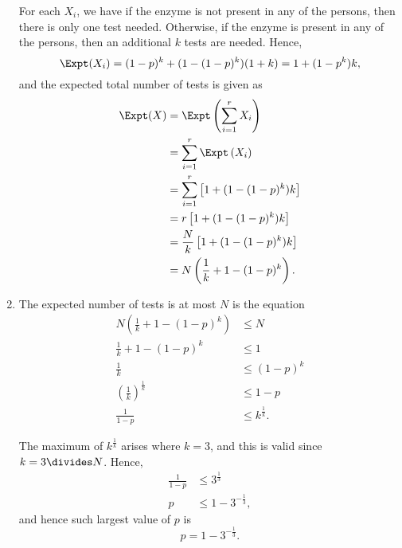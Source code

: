 \begin{enumerate}
          For each \(X_i\), we have if the enzyme is not present in any of the persons, then there is only one test needed. Otherwise, if the enzyme is present in any of the persons, then an additional \(k\) tests are needed. Hence,
          \[
              \Expt(X_i) = (1 - p)^k + (1 - (1 - p)^k) (1 + k) = 1 + (1 - p^k) k,
          \]
          and the expected total number of tests is given as
          \begin{align*}
              \Expt(X) & = \Expt\left(\sum_{i = 1}^{r} X_i\right)              \\
                       & = \sum_{i = 1}^{r} \Expt\left(X_i\right)              \\
                       & = \sum_{i = 1}^{r} \left[1 + (1 - (1 - p)^k) k\right] \\
                       & = r \left[1 + (1 - (1 - p)^k) k\right]                \\
                       & = \frac{N}{k} \left[1 + (1 - (1 - p)^k) k\right]      \\
                       & = N \left(\frac{1}{k} + 1 - (1 - p)^k\right).
          \end{align*}

    \item The expected number of tests is at most \(N\) is the equation
          \begin{align*}
              N \left(\frac{1}{k} + 1 - (1 - p)^k\right) & \leq N                \\
              \frac{1}{k} + 1 - (1 - p)^k                & \leq 1                \\
              \frac{1}{k}                                & \leq (1 - p)^k        \\
              \left(\frac{1}{k}\right)^{\frac{1}{k}}     & \leq 1 - p            \\
              \frac{1}{1 - p}                            & \leq k^{\frac{1}{k}}.
          \end{align*}

          The maximum of \(k^{\frac{1}{k}}\) arises where \(k = 3\), and this is valid since \(k = 3 \divides N\). Hence,
          \begin{align*}
              \frac{1}{1 - p} & \leq 3^{\frac{1}{3}}       \\
              p               & \leq 1 - 3^{-\frac{1}{3}},
          \end{align*}
          and hence such largest value of \(p\) is
          \[
              p = 1 - 3^{-\frac{1}{3}}.
          \]


\end{enumerate}

